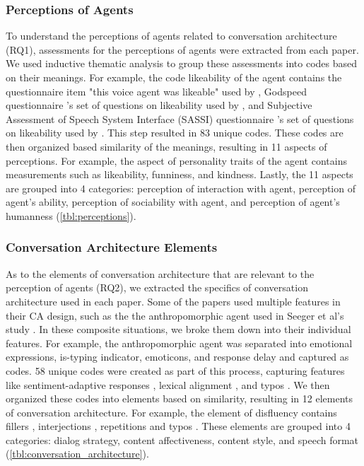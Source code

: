 \subsubsection*{Perceptions of Agents} To understand the perceptions of agents related to conversation architecture (RQ1), assessments for the perceptions of agents were extracted from each paper. We used inductive thematic analysis to group these assessments into codes based on their meanings. For example, the code likeability of the agent contains the questionnaire item "this voice agent was likeable" used by \cite{cuadra2021my}\cmt{[67]}, Godspeed questionnaire \cite{bartneck2009measurement}'s set of questions on likeability used by \cite{linnemann2018can}\cmt{[15]}, and Subjective Assessment of Speech System Interface (SASSI) questionnaire \cite{hone2000towards}'s set of questions on likeability used by \cite{chan2021kinvoices, choi2020nobody}\cmt{[74][54]}. This step resulted in 83 unique codes. These codes are then organized based similarity of the meanings, resulting in 11 aspects of perceptions. For example, the aspect of personality traits of the agent contains measurements such as likeability, funniness, and kindness. Lastly, the 11 aspects are grouped into 4 categories: perception of interaction with agent, perception of agent's ability, perception of sociability with agent, and perception of agent's humanness (\autoref{tbl:perceptions}).

\subsubsection*{Conversation Architecture Elements}
As to the elements of conversation architecture that are relevant to the perception of agents (RQ2), we extracted the specifics of conversation architecture used in each paper. Some of the papers used multiple features in their CA design, such as the the anthropomorphic agent used in Seeger et al's study \cite{seeger2021chatbots}\cmt{[35]}. In these composite situations, we broke them down into their individual features. For example, the anthropomorphic agent \cite{seeger2021chatbots}\cmt{[35]} was separated into emotional expressions, is-typing indicator, emoticons, and response delay and captured as codes. 58 unique codes were created as part of this process, capturing features like sentiment-adaptive responses \cite{diederich2019emulating}\cmt{[25]}, lexical alignment \cite{spillner2021talk}\cmt{[18]}, and typos \cite{westerman2019believe}\cmt{[9]}. We then organized these codes into elements based on similarity, resulting in 12 elements of conversation architecture. For example, the element of disfluency contains fillers \cite{jeong2019exploring, wester2015artificial}\cmt{[10][14]}, interjections \cite{ceha2022expressive, hu2021enhancing}\cmt{[77][56]}, repetitions \cite{yang2021effect}\cmt{[72]} and typos \cite{westerman2019believe}\cmt{[9]}. These elements are grouped into 4 categories: dialog strategy, content affectiveness, content style, and speech format (\autoref{tbl:conversation_architecture}).

